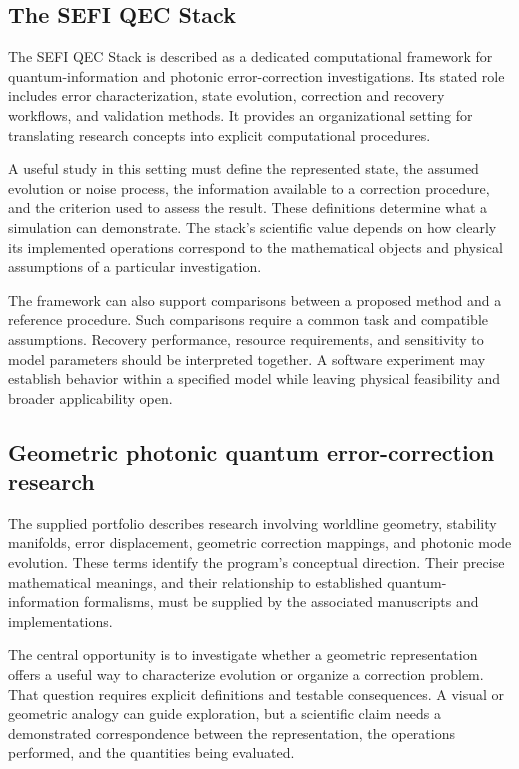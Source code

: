 \documentclass[10pt,letterpaper]{article}
\begin{document}
\subsection{The SEFI QEC Stack}
The SEFI QEC Stack is described as a dedicated computational framework for quantum-information and photonic error-correction investigations. Its stated role includes error characterization, state evolution, correction and recovery workflows, and validation methods. It provides an organizational setting for translating research concepts into explicit computational procedures.

A useful study in this setting must define the represented state, the assumed evolution or noise process, the information available to a correction procedure, and the criterion used to assess the result. These definitions determine what a simulation can demonstrate. The stack's scientific value depends on how clearly its implemented operations correspond to the mathematical objects and physical assumptions of a particular investigation.

The framework can also support comparisons between a proposed method and a reference procedure. Such comparisons require a common task and compatible assumptions. Recovery performance, resource requirements, and sensitivity to model parameters should be interpreted together. A software experiment may establish behavior within a specified model while leaving physical feasibility and broader applicability open.

\subsection{Geometric photonic quantum error-correction research}
The supplied portfolio describes research involving worldline geometry, stability manifolds, error displacement, geometric correction mappings, and photonic mode evolution. These terms identify the program's conceptual direction. Their precise mathematical meanings, and their relationship to established quantum-information formalisms, must be supplied by the associated manuscripts and implementations.

The central opportunity is to investigate whether a geometric representation offers a useful way to characterize evolution or organize a correction problem. That question requires explicit definitions and testable consequences. A visual or geometric analogy can guide exploration, but a scientific claim needs a demonstrated correspondence between the representation, the operations performed, and the quantities being evaluated.
\end{document}
